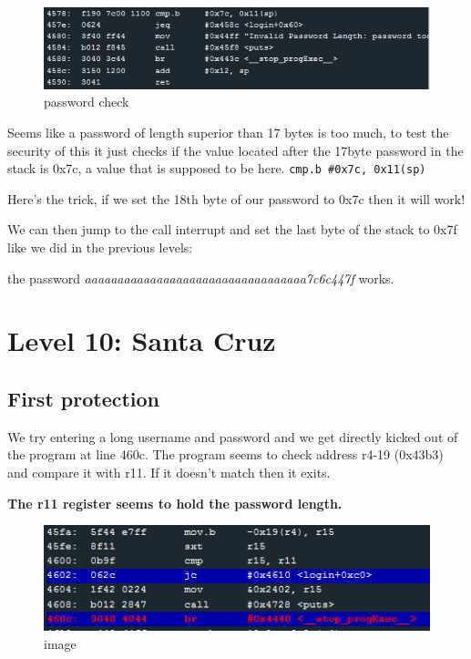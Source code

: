 \documentclass[a4paper,11pt]{article}
\begin{document}
\begin{figure}[htbp]
\centering
\includegraphics{img/8.PNG}
\caption{password check}
\end{figure}

Seems like a password of length superior than 17 bytes is too much, to
test the security of this it just checks if the value located after the
17byte password in the stack is 0x7c, a value that is supposed to be
here. \texttt{cmp.b   \#0x7c, 0x11(sp)}

Here's the trick, if we set the 18th byte of our password to 0x7c then
it will work!

We can then jump to the call interrupt and set the last byte of the
stack to 0x7f like we did in the previous levels:

the password \emph{aaaaaaaaaaaaaaaaaaaaaaaaaaaaaaaaaa7c6c447f} works.

\section{Level 10: Santa Cruz}\label{level-10-santa-cruz}

\subsection{First protection}\label{first-protection}

We try entering a long username and password and we get directly kicked
out of the program at line 460c. The program seems to check address
r4-19 (0x43b3) and compare it with r11. If it doesn't match then it
exits.

\textbf{The r11 register seems to hold the password length.}

\begin{figure}[htbp]
\centering
\includegraphics{img/10_1.PNG}
\caption{image}
\end{figure}
\end{document}
